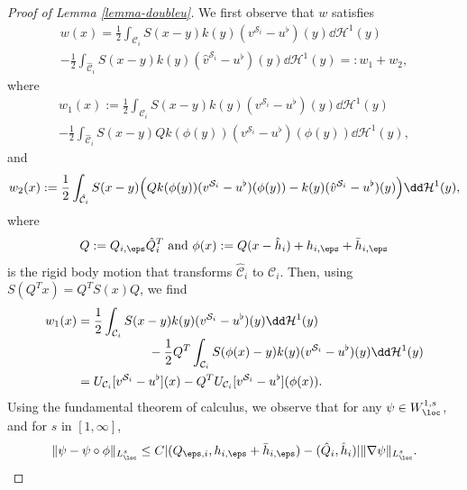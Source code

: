 \begin{proof}[Proof of Lemma \ref{lemma-doubleu}]
We first observe that $w$ satisfies\vspace*{-3pt}
\begin{multline*}
w(x) = \frac12\int_{\mathcal C_i} S(x-y) k(y) (v^{{\mathcal S}_i} - u^\flat)(y) \dd \mathcal H^1(y)
\\[-5pt]
- \frac12 \int_{\hat {\mathcal C}_i} S(x-y) k(y) (\hat v^{{\mathcal S}_i} - u^\flat)(y) \dd \mathcal H^1(y) =: w_1 + w_2,
\end{multline*}
where\vspace*{-3pt}
\begin{multline*}
w_1 (x):= \frac12 \int_{\mathcal C_i} S(x-y) k(y) (v^{{\mathcal S}_i} - u^\flat)(y) \dd \mathcal H^1(y) \\[-5pt]
- \frac12 \int_{\hat {\mathcal C}_i} S(x-y) Q k(\phi(y)) (v^{{\mathcal S}_i} - u^\flat)(\phi(y)) \dd \mathcal H^1(y),
\end{multline*}
and\vspace*{-3pt}
\begin{equation*}
w_2 (x) := \frac12 \int_{\hat {\mathcal C}_i} S(x-y) \Bigl(Q k(\phi(y)) (v^{{\mathcal S}_i} - u^\flat)(\phi(y)) - k(y)(\hat v^{{\mathcal S}_i} - u^\flat)(y) \Bigr) \dd \mathcal H^1(y),
\end{equation*}
where\vspace*{-3pt}
\[
Q:=Q_{i,\eps} \hat Q_{i}^T
\text{ and } \phi(x) := Q (x - \hat h_i) + h_{i,\eps} + \bar h_{i,\eps}
\]
is the rigid body motion that transforms $\hat {\mathcal C}_i$ to ${\mathcal C}_i$.
Then, using $S(Q^Tx) = Q^T S(x) Q$, we find\vspace*{-3pt}
\begin{align*}
w_1(x) &= \frac12 \int_{\mathcal C_i} S(x-y) k(y) (v^{{\mathcal S}_i} - u^\flat)(y) \dd \mathcal H^1(y) \\[-3pt]
&\hspace*{2cm} - \frac12 Q^T \int_{\mathcal C_i} S(\phi(x)-y) k(y) (v^{{\mathcal S}_i} - u^\flat)(y) \dd \mathcal H^1(y) \\
&= U_{\mathcal C_i}[v^{{\mathcal S}_i} - u^\flat](x)- Q^T U_{\mathcal C_i}[v^{{\mathcal S}_i} - u^\flat](\phi(x)).
\end{align*}
Using the fundamental theorem of calculus, we observe that for any $\psi \in W^{1,s}_\loc$, and for $s$ in $[1,\infty]$,\vspace*{-3pt}
\begin{equation} \label{est:Poincare.psi}
\|\psi - \psi \circ \phi\|_{L^s_\loc} \leq C |(Q_{\eps,i},h_{i,\eps} + \bar h_{i,\eps}) - (\hat Q_i,\hat h_i)| \|\nabla \psi\|_{L^s_\loc}.

\end{equation}
\end{proof}
